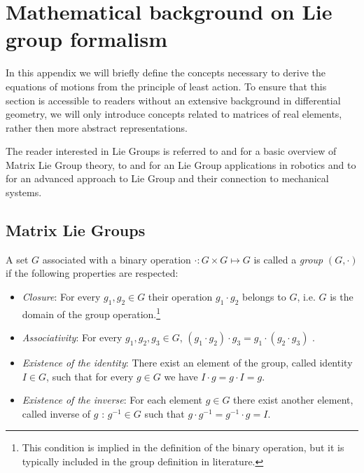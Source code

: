 \chapter{Mathematical background on Lie group formalism}
\label{liegroups}

In this appendix we will briefly define the concepts necessary to derive the equations of motions from the principle of least action. To ensure that this section is accessible to readers without an extensive background in differential geometry, we will only introduce concepts related to matrices of real elements, rather then more abstract representations.

The reader interested in Lie Groups is referred to \citep{hall2003} and \citep{stillwell2008} for a basic overview of Matrix Lie Group theory, to \citep{selig2005} and \cite[Appendix]{murray1994} for an Lie Group applications in robotics and to \citep{marsden1999introduction} for an advanced approach to Lie Group and their connection to mechanical systems.  
\section{Matrix Lie Groups}
\begin{definition}[Group]
A set $G$ associated with a binary operation $\cdot : G \times G \mapsto G $ is called a \emph{group} $(G,\cdot)$ if the following properties are respected:
\begin{itemize}
    \item \emph{Closure}: For every $g_1, g_2 \in G$ their operation $g_1 \cdot g_2$ belongs to $G$, i.e. $G$ is the domain of the group operation.\footnote{This condition is implied in the definition of the binary operation, but it is typically included in the group definition in literature.}  
    \item \emph{Associativity}: For every $g_1, g_2, g_3 \in G$, $(g_1 \cdot g_2) \cdot g_3 = g_1 \cdot ( g_2 \cdot g_3) $ .
    \item \emph{Existence of the identity}: There exist an element of the group, called identity $I \in G$, such that for every $g \in G$ we have  $I \cdot g = g \cdot I = g$.
    \item \emph{Existence of the inverse}: For each element $g \in G$ there exist another element, called inverse of $g$ : $g^{-1} \in G$ such that $g \cdot g^{-1} = g^{-1} \cdot g = I$.
\end{itemize}
\end{definition}

